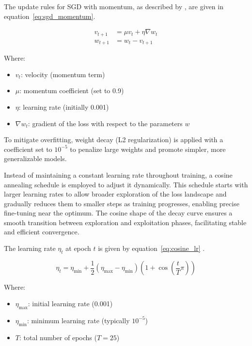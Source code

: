 The update rules for SGD with momentum, as described by \parencite{loshchilov2016sgdr}, are given in equation~\ref{eq:sgd_momentum}.

\begin{align}
v_{t+1} &= \mu v_t + \eta \nabla w_t \\
w_{t+1} &= w_t - v_{t+1}
\label{eq:sgd_momentum}
\end{align}




Where:  
\begin{itemize}
  \item $v_t$: velocity (momentum term)
  \item $\mu$: momentum coefficient (set to 0.9)
  \item $\eta$: learning rate (initially 0.001)
  \item $\nabla w_t$: gradient of the loss with respect to the parameters $w$
\end{itemize}

To mitigate overfitting, weight decay (L2 regularization) is applied with a coefficient set to $10^{-5}$ to penalize large weights and promote simpler, more generalizable models.

Instead of maintaining a constant learning rate throughout training, a cosine annealing schedule is employed to adjust it dynamically. This schedule starts with larger learning rates to allow broader exploration of the loss landscape and gradually reduces them to smaller steps as training progresses, enabling precise fine-tuning near the optimum. The cosine shape of the decay curve ensures a smooth transition between exploration and exploitation phases, facilitating stable and efficient convergence.

The learning rate $\eta_t$ at epoch $t$ is given by equation~\ref{eq:cosine_lr} \parencite{loshchilov2016sgdr}.

\begin{equation}
\eta_t = \eta_{\min} + \frac{1}{2}(\eta_{\max} - \eta_{\min}) \left(1 + \cos\left(\frac{t}{T} \pi\right)\right)
\label{eq:cosine_lr}
\end{equation}



Where:  
\begin{itemize}
  \item $\eta_{\max}$: initial learning rate (0.001)
  \item $\eta_{\min}$: minimum learning rate (typically $10^{-5}$)
  \item $T$: total number of epochs ($T = 25$)
\end{itemize}

